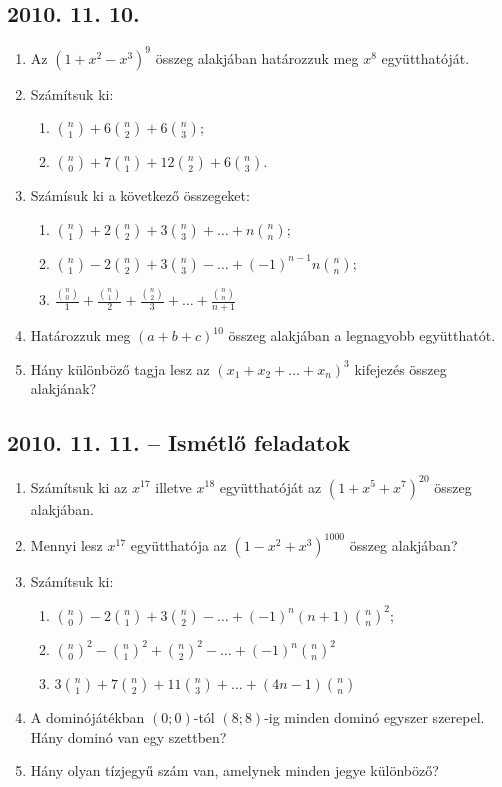 \documentclass{article}
\newenvironment{abc}{\begin{enumerate}[label=\textit{\alph*})]}{\end{enumerate}}
\begin{document}
\subsection*{2010. 11. 10.}
\begin{enumerate}
\item Az $(1+x^{2}-x^{3})^{9}$ összeg alakjában határozzuk meg $x^{8}$ együtthatóját.
\item Számítsuk ki:
	\begin{abc}
		\item $\binom{n}{1}+6\binom{n}{2}+6\binom{n}{3}$;
        \item $\binom{n}{0}+7\binom{n}{1}+12\binom{n}{2}+6\binom{n}{3}$.
	\end{abc}
\item Számísuk ki a következő összegeket:
	\begin{abc}
    	\item $\binom{n}{1}+2\binom{n}{2}+3\binom{n}{3}+\dots+n\binom{n}{n}$;
        \item $\binom{n}{1}-2\binom{n}{2}+3\binom{n}{3}-\dots+(-1)^{n-1}n\binom{n}{n}$;
        \item $\frac{\binom{n}{0}}{1}+\frac{\binom{n}{1}}{2}+\frac{\binom{n}{2}}{3}+\dots+\frac{\binom{n}{n}}{n+1}$   
    \end{abc}
\item Határozzuk meg $(a+b+c)^{10}$ összeg alakjában a legnagyobb együtthatót.
\item Hány különböző tagja lesz az $(x_{1}+x_{2}+\dots+x_{n})^{3}$ kifejezés összeg alakjának?
\end{enumerate}


\subsection*{2010. 11. 11. -- Ismétlő feladatok}
\begin{enumerate}
\item Számítsuk ki az $x^{17}$ illetve $x^{18}$ együtthatóját az $(1+x^{5}+x^{7})^{20}$ összeg alakjában.
\item Mennyi lesz $x^{17}$ együtthatója az $(1-x^{2}+x^{3})^{1000}$ összeg alakjában?
\item Számítsuk ki:
	\begin{abc}
    	\item  $\binom{n}{0}-2\binom{n}{1}+3\binom{n}{2}-\dots+(-1)^{n}(n+1)\binom{n}{n}^{2}$;
        \item  $\binom{n}{0}^{2}-\binom{n}{1}^{2}+\binom{n}{2}^{2}-\dots+(-1)^{n}\binom{n}{n}^{2}$
        \item  $3\binom{n}{1}+7\binom{n}{2}+11\binom{n}{3}+\dots+(4n-1)\binom{n}{n}$
    \end{abc}
\item A dominójátékban $(0;0)$-tól $(8;8)$-ig minden dominó egyszer szerepel. Hány dominó van egy szettben?
\item Hány olyan tízjegyű szám van, amelynek minden jegye különböző?
\end{enumerate}
\end{document}

